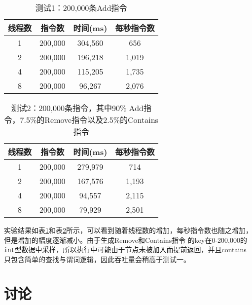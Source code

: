 \documentclass[UTF8, 10pt, twocolumn]{article}
\begin{document}


\begin{table}[ht]
  \centering
  \caption{测试1：200,000条Add指令}
  \begin{tabular}{cccc}
    \toprule
    线程数 & 指令数 & 时间(ms) & 每秒指令数 \\
    \midrule
    1 & 200,000 & 304,560 & 656 \\
    2 & 200,000 & 196,218 & 1,019 \\
    4 & 200,000 & 115,205 & 1,735 \\
    8 & 200,000 & 96,267 & 2,076 \\
    \bottomrule
  \end{tabular}
  \label{tab:table1}
\end{table}

\begin{table}[ht]
  \centering
  \caption{测试2：200,000条指令，其中90\% Add指令，7.5\%的Remove指令以及2.5\%的Contains指令}
  \begin{tabular}{cccc}
    \toprule
    线程数 & 指令数 & 时间(ms) & 每秒指令数 \\
    \midrule
    1 & 200,000 & 279,979 & 714 \\
    2 & 200,000 & 167,576 & 1,193 \\
    4 & 200,000 & 94,557 & 2,115 \\
    8 & 200,000 & 79,929 & 2,501 \\
    \bottomrule
  \end{tabular}
  \label{tab:table2}
\end{table}

实验结果如表\ref{tab:table1}和表\ref{tab:table2}所示，可以看到随着线程数的增加，每秒指令数也随之增加，但是增加的幅度逐渐减小。由于生成Remove和Contains指令
的key在0-200,000的\verb|int|型数据中采样，所以执行中可能由于节点未被加入而提前返回，并且contains只包含简单的查找与谓词逻辑，因此吞吐量会稍高于测试一。

\section{讨论}
\end{document}
